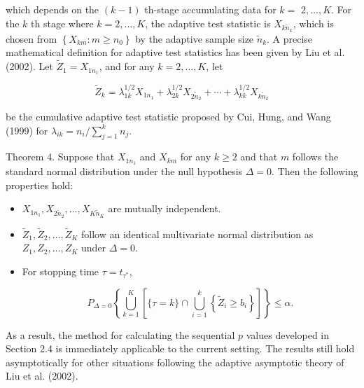 \documentclass[10pt]{article}
\begin{document}
which depends on the $(k-1)$ th-stage accumulating data for $k=$ $2, \ldots, K$. For the $k$ th stage where $k=2, \ldots, K$, the adaptive test statistic is $X_{k \tilde{n}_{k}}$, which is chosen from $\left\{X_{k m}: m \geq n_{0}\right\}$ by the adaptive sample size $\tilde{n}_{k}$. A precise mathematical definition for adaptive test statistics has been given by Liu et al. (2002). Let $\tilde{Z}_{1}=X_{1 n_{1}}$, and for any $k=2, \ldots, K$, let


\begin{equation*}
\tilde{Z}_{k}=\lambda_{1 k}^{1 / 2} X_{1 n_{1}}+\lambda_{2 k}^{1 / 2} X_{2 \tilde{n}_{2}}+\cdots+\lambda_{k k}^{1 / 2} X_{k \tilde{n}_{k}} \tag{11}
\end{equation*}


be the cumulative adaptive test statistic proposed by Cui, Hung, and Wang (1999) for $\lambda_{i k}=n_{i} / \sum_{j=1}^{k} n_{j}$.

Theorem 4. Suppose that $X_{1 n_{1}}$ and $X_{k m}$ for any $k \geq 2$ and that $m$ follows the standard normal distribution under the null hypothesis $\Delta=0$. Then the following properties hold:

\begin{itemize}
  \item[a.] $X_{1 n_{1}}, X_{2 \tilde{n}_{2}}, \ldots, X_{K \tilde{n}_{K}}$ are mutually independent.
  \item[b.] $\tilde{Z}_{1}, \tilde{Z}_{2}, \ldots, \tilde{Z}_{K}$ follow an identical multivariate normal distribution as $Z_{1}, Z_{2}, \ldots, Z_{K}$ under $\Delta=0$.
  \item[c.] For stopping time $\tau=t_{\tau^{*}}$,

\begin{equation*}
P_{\Delta=0}\left\{\bigcup_{k=1}^{K}\left[\{\tau=k\} \cap \bigcup_{i=1}^{k}\left\{\tilde{Z}_{i} \geq b_{i}\right\}\right]\right\} \leq \alpha . \tag{12}
\end{equation*}

\end{itemize}

As a result, the method for calculating the sequential $p$ values developed in Section 2.4 is immediately applicable to the current setting. The results still hold asymptotically for other situations following the adaptive asymptotic theory of Liu et al. (2002).
\end{document}
